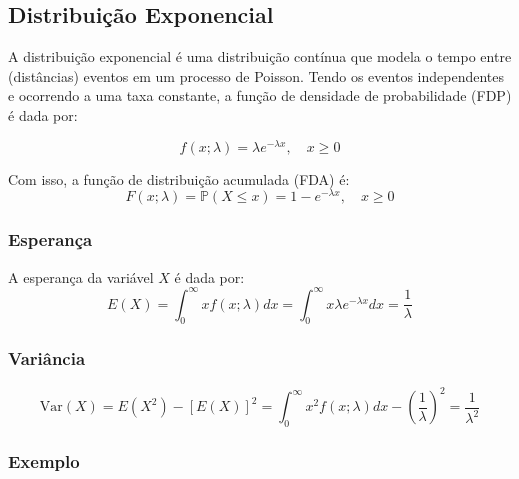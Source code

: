 \documentclass[
]{article}
\begin{document}
\hypertarget{distribuiuxe7uxe3o-exponencial}{%
\subsection{Distribuição Exponencial}\label{distribuiuxe7uxe3o-exponencial}}

A distribuição exponencial é uma distribuição contínua que modela o tempo entre (distâncias) eventos em um processo de Poisson. Tendo os eventos independentes e ocorrendo a uma taxa constante, a função de densidade de probabilidade (FDP) é dada por:

\[
f(x; \lambda) = \lambda e^{-\lambda x}, \quad x \geq 0
\]

Com isso, a função de distribuição acumulada (FDA) é:
\[
F(x; \lambda) = \mathbb{P}(X \leq x) = 1 - e^{-\lambda x}, \quad x \geq 0
\]

\hypertarget{esperanuxe7a-6}{%
\subsubsection{Esperança}\label{esperanuxe7a-6}}

A esperança da variável \(X\) é dada por:
\[
E(X) = \int_0^\infty x f(x; \lambda) dx
= \int_0^\infty x \lambda e^{-\lambda x} dx = \frac{1}{\lambda}
\]

\hypertarget{variuxe2ncia-6}{%
\subsubsection{Variância}\label{variuxe2ncia-6}}

\[
\text{Var}(X) = E(X^2) - [E(X)]^2 = \int_0^\infty x^2 f(x; \lambda) dx - \left(\frac{1}{\lambda}\right)^2 = \frac{1}{\lambda^2}
\]

\hypertarget{exemplo-exp}{%
\subsubsection{Exemplo}\label{exemplo-exp}}
\end{document}
